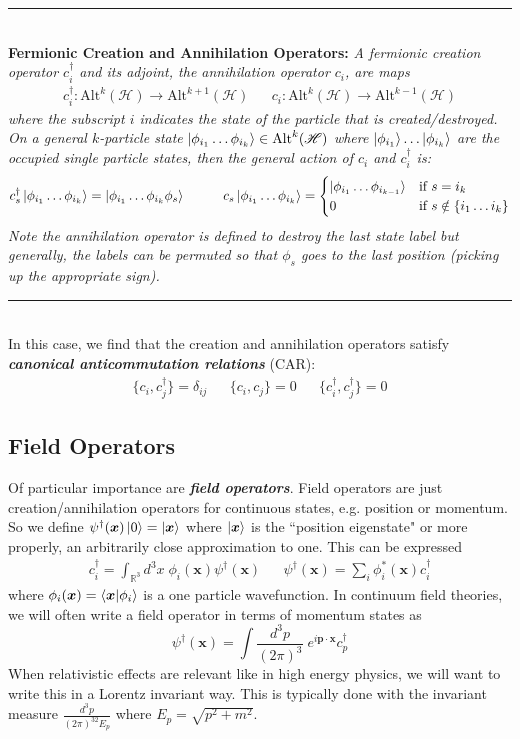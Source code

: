 \documentclass[onecolumn]{gwclass}
\def \*#1{\boldsymbol{#1}}
\renewcommand{\t}[1]{\text{#1}}
\begin{document}
\noindent\rule{\textwidth}{1pt}\\
\textbf{Fermionic Creation and Annihilation Operators:} \emph{A fermionic creation operator $c_i^\dagger$ and its adjoint, the annihilation operator $c_i$, are maps}
\begin{align*}
	c_i^\dagger : \t{Alt}^k(\mathscr{H})\to \t{Alt}^{k+1}(\mathscr{H}) && c_i:\t{Alt}^k(\mathscr{H})\to \t{Alt}^{k-1}(\mathscr{H})
\end{align*}
\emph{where the subscript $i$ indicates the state of the particle that is created/destroyed. On a general $k$-particle state} $\ket{\phi_{i_1}\dots \phi_{i_k}}\in \t{Alt}^k(\mathscr{H})$ \emph{where $\ket{\phi_{i_1}}\dots\ket{\phi_{i_k}}$ are the occupied single particle states, then the general action of $c_i$ and $c_i^\dagger$ is:}
\begin{align*}
	c_s^\dagger\ket{\phi_{i_1}\dots \phi_{i_k}}= \ket{\phi_{i_1}\dots \phi_{i_k} \phi_s} &&\quad\quad
	c_s\ket{\phi_{i_1}\dots \phi_{i_k}}= 
	\begin{cases}
		|\phi_{i_1}\dots \phi_{i_{k-1}} \rangle & \t{if } s = i_k \\
		0 & \t{if } s \notin \{i_1\dots i_k\}
	\end{cases}
\end{align*}
\emph{Note the annihilation operator is defined to destroy the last state label but generally, the labels can be permuted so that $\phi_s$ goes to the last position (picking up the appropriate sign).}\\
\noindent\rule{\textwidth}{1pt}\\
In this case, we find that the creation and annihilation operators satisfy \textbf{\emph{canonical anticommutation relations}} (CAR):
\begin{align*}
	\{c_i,c_j^\dagger\} = \delta_{ij} && \{c_i,c_j\}=0 && \{c_i^\dagger, c_j^\dagger\}=0
\end{align*}



\subsection{Field Operators}
Of particular importance are \textbf{\emph{field operators}}. Field operators are just creation/annihilation operators for continuous states, e.g. position or momentum. So we define $\psi^\dagger(\*x)\ket{0}=\ket{\*x}$ where $\ket{\*x}$ is the ``position eigenstate" or more properly, an arbitrarily close approximation to one. This can be expressed
\begin{align*}
	c_i^\dagger = \int_{\mathbb{R}^3}d^3x\;\phi_i(\*x)\psi^\dagger(\*x) && \psi^\dagger(\*x)= \sum_i \phi_i^*(\*x) c_i^\dagger
\end{align*}
where $\phi_i(\*x) = \bra{\*x}\ket{\phi_i}$ is a one particle wavefunction. In continuum field theories, we will often write a field operator in terms of momentum states as
$$ \psi^\dagger(\*x) = \int \frac{d^3p}{(2\pi)^3}\; e^{i\*p\cdot\*x} c_p^\dagger $$
When relativistic effects are relevant like in high energy physics, we will want to write this in a Lorentz invariant way. This is typically done with the invariant measure $\frac{d^3p}{(2\pi)^32E_p}$ where $E_p=\sqrt{p^2 + m^2}$.
\end{document}
